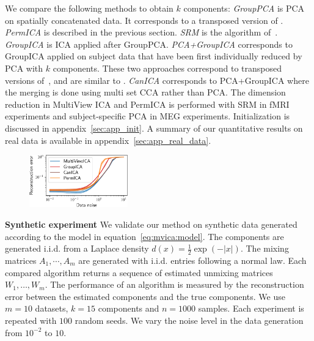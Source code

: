\documentclass{report}
\begin{document}
{We compare the following methods to obtain $k$ components:
%
\emph{GroupPCA} is PCA on spatially concatenated data. It corresponds to a transposed version of \cite{smith2014group}.
%
\emph{PermICA} is described in the previous section.
%
\emph{SRM} is  the algorithm of~\cite{chen2015reduced}.
%
\emph{GroupICA} is ICA applied after GroupPCA.
%
\emph{PCA+GroupICA} corresponds to GroupICA applied on subject data that have been first individually reduced by PCA with $k$ components. 
%
These two approaches correspond to transposed versions of~\cite{calhoun2001fmri}, and are similar to \cite{eichele2011eegift}.
\emph{CanICA} corresponds to PCA+GroupICA where the merging is done using multi set CCA rather than PCA. The dimension reduction in MultiView ICA and PermICA is performed with SRM in fMRI experiments and subject-specific PCA in MEG experiments. Initialization is discussed in appendix~\ref{sec:app_init}. A summary of our quantitative results on real data is available in appendix~\ref{sec:app_real_data}.

\begin{figure}
\label{fig:synth}
\includegraphics[width=0.38\textwidth]{figures/mvica/distance_expe.pdf}
\end{figure}

\textbf{Synthetic experiment}
We validate our method on synthetic data generated according to the model in equation~\eqref{eq:mvica:model}.
%
The components are generated i.i.d. from a Laplace density $d(x)=\frac12\exp(-|x|)$.
%
The mixing matrices $A_1,\cdots, A_m$ are generated with i.i.d. entries following a normal law.
Each compared algorithm returns a sequence of estimated unmixing matrices $W_1, \dots, W_m$.
%
The performance of an algorithm is measured by the reconstruction error between the estimated components and the true components.
%
%
We use $m=10$ datasets, $k=15$ components and $n=1000$ samples. Each experiment is repeated with $100$ random seeds.
%
We vary the noise level in the data generation from $10^{-2}$ to $10$.

}
\end{document}
